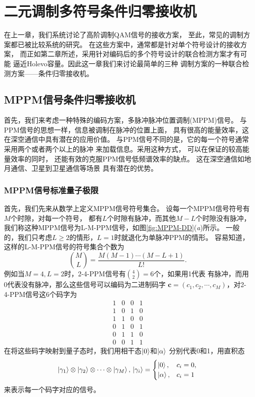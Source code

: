 \chapter{二元调制多符号条件归零接收机}
在上一章，我们系统讨论了高阶调制QAM信号的接收方案，
至此，常见的调制方案都已被比较系统的研究。
在这些方案中，通常都是针对单个符号设计的接收方案，
而正如第二章所述，采用针对编码后的多个符号设计的联合检测方案才有可能
逼近Holevo容量。因此这一章我们来讨论最简单的三种
调制方案的一种联合检测方案——条件归零接收机。


\section{MPPM信号条件归零接收机}
首先，我们来考虑一种特殊的编码方案，多脉冲脉冲位置调制(MPPM)信号。
与PPM信号的思想一样，信息被调制在脉冲的位置上面，
具有很高的能量效率，这在深空通信中具有潜在的应用价值\cite{hemmati2006deep}。
与PPM信号不同的是，它的每一个符号通常采用两个或者两个以上的脉冲
来加载信息。采用这种方式，
可以在保证的较高能量效率的同时，
还能有效的克服PPM信号低频谱效率的缺点\cite{sugiyama1989mppm}。
这在深空通信如地月通信、卫星到卫星通信等场景
具有潜在的优势\cite{hemmati2006deep,waseda2011numerical}。

\subsection{MPPM信号标准量子极限}
首先，我们先来从数学上定义MPPM信号符号集合。
设每一个MPPM信号符号有$M$个时隙，对每一个符号，
都有$L$个时隙有脉冲，而其他$M-L$个时隙没有脉冲，
我们称这种MPPM信号为L-M-PPM信号，如图\ref{fig:MPPM-DD}(\textit{a})所示。
一般的，我们只考虑$L \ge 2$的情形，$L=1$时就退化为单脉冲PPM的情形。
容易知道，这样的L-M-PPM信号的符号集合个数为
\begin{equation}
\binom{M}{L} = \frac{M(M-1)\cdots(M-L+1)}{L!}.
\end{equation}
例如当$M=4, L=2$时，2-4-PPM信号有$\binom{4}{2}=6$个，如果用1代表
有脉冲，而用0代表没有脉冲，那么这些信号可以编码为二进制码字
$\bm{c} = (c_1, c_2, \cdots, c_M)$，对2-4-PPM信号这6个码字为
\begin{equation}
\begin{array}{cccc}
1 & 0 & 0 & 1 \\
1 & 0 & 1 & 0 \\
1 & 1 & 0 & 0 \\
0 & 1 & 0 & 1 \\
0 & 1 & 1 & 0 \\
0 & 0 & 1 & 1   
\end{array}
\end{equation}
在将这些码字映射到量子态时，我们用相干态$\ket{0}$和$\ket{\alpha}$
分别代表0和1，用直积态
\begin{equation}
\ket{\gamma_1}\otimes\ket{\gamma_2}\otimes\cdots\otimes\ket{\gamma_M}, \\
\ket{\gamma_i} = \begin{cases}
                    \ket{0}, & c_i=0, \\
                    \ket{\alpha}, & c_i=1
                \end{cases}
\end{equation}
来表示每一个码字对应的信号。

